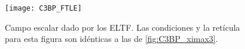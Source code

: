 \begin{figure}
 \centering
 \texttt{[image: C3BP\_FTLE]}
 \caption{Campo escalar dado por los ELTF. Las condiciones y la retícula para esta figura son idénticas a las de \ref{fig:C3BP_ximax3}.}
 \label{fig:C3BP_FTLE}
\end{figure}






